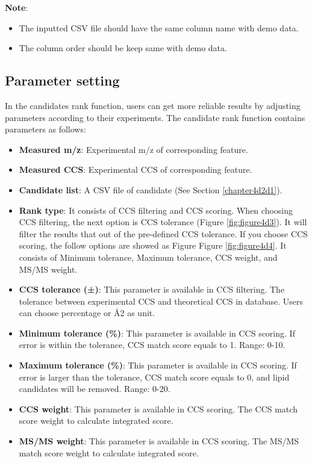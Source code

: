 \documentclass[12pt,]{book}
\providecommand{\tightlist}{%
  \setlength{\itemsep}{0pt}\setlength{\parskip}{0pt}}
\theoremstyle{definition}
\theoremstyle{definition}
\theoremstyle{definition}
\theoremstyle{remark}
\begin{document}
\textbf{Note}:

\begin{itemize}
\tightlist
\item
  The inputted CSV file should have the same column name with demo data.
\item
  The column order should be keep same with demo data.
\end{itemize}

\subsection{Parameter setting}\label{chapter4d2d2}

In the candidates rank function, users can get more reliable results by
adjusting parameters according to their experiments. The candidate rank
function contains parameters as follows:

\begin{itemize}
\tightlist
\item
  \textbf{Measured m/z}: Experimental m/z of corresponding feature.
\item
  \textbf{Measured CCS}: Experimental CCS of corresponding feature.
\item
  \textbf{Candidate list}: A CSV file of candidate (See Section
  \ref{chapter4d2d1}).
\item
  \textbf{Rank type}: It consists of CCS filtering and CCS scoring. When
  choosing CCS filtering, the next option is CCS tolerance (Figure
  \ref{fig:figure4d3}). It will filter the results that out of the
  pre-defined CCS tolerance. If you choose CCS scoring, the follow
  options are showed as Figure Figure \ref{fig:figure4d4}. It consists
  of Minimum tolerance, Maximum tolerance, CCS weight, and MS/MS weight.
\item
  \textbf{CCS tolerance (±)}: This parameter is available in CCS
  filtering. The tolerance between experimental CCS and theoretical CCS
  in database. Users can choose percentage or Å2 as unit.
\item
  \textbf{Minimum tolerance (\%)}: This parameter is available in CCS
  scoring. If error is within the tolerance, CCS match score equals to
  1. Range: 0-10.
\item
  \textbf{Maximum tolerance (\%)}: This parameter is available in CCS
  scoring. If error is larger than the tolerance, CCS match score equals
  to 0, and lipid candidates will be removed. Range: 0-20.
\item
  \textbf{CCS weight}: This parameter is available in CCS scoring. The
  CCS match score weight to calculate integrated score.
\item
  \textbf{MS/MS weight}: This parameter is available in CCS scoring. The
  MS/MS match score weight to calculate integrated score.
\end{itemize}
\end{document}
